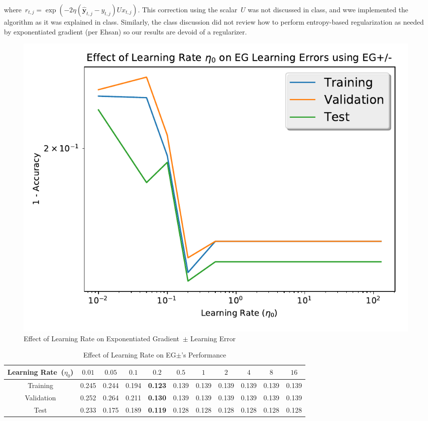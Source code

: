 \documentclass{report}
\newcommand{\yhat}{\hat{\mathbf{y}}}
\begin{document}
  \noindent
  where~${r_{t,j}=\exp\left(-2\eta(\yhat_{t,j}-y_{t,j})Ux_{t,j}\right)}$.  This correction using the scalar~$U$ was not discussed in class, and wwe implemented the algorithm as it was explained in class.  Similarly, the class discussion did not review how to perform entropy-based regularization as needed by exponentiated gradient (per Ehsan) so our results are devoid of a regularizer.
    
  
    
  \begin{figure}
    \centering
    \includegraphics[scale=.5]{egLearningRate}
    \caption{Effect of Learning Rate on Exponentiated Gradient~$\pm$ Learning Error}\label{fig:egLearningRate}
  \end{figure}

  \begin{table}
    \centering
    \caption{Effect of Learning Rate on EG$\pm$'s Performance}
    \label{tab:egLearningRate}
    \begin{tabular}{c||c|c|c|c|c|c|c|c|c|c}
      \hline
      Learning Rate~($\eta_0$)  & $0.01$ & $0.05$ & $0.1$ & $0.2$ & $0.5$ & $1$ & $2$ & $4$ & $8$ & $16$ \\ \hline
      Training   & 0.245  &  0.244  &  0.194  &  \textbf{0.123}  &  0.139  &  0.139   &  0.139  &  0.139  &   0.139   &  0.139   \\ \hline
      Validation & 0.252  &  0.264  &  0.211  &  \textbf{0.130}  &  0.139  &  0.139   &  0.139  &  0.139  &  0.139   &  0.139   \\ \hline
      Test       & 0.233  & 0.175  & 0.189  & \textbf{0.119}  &  0.128  &  0.128   &  0.128  &  0.128  &  0.128  &  0.128   \\ \hline
    \end{tabular}
  \end{table}
  
\end{document}
